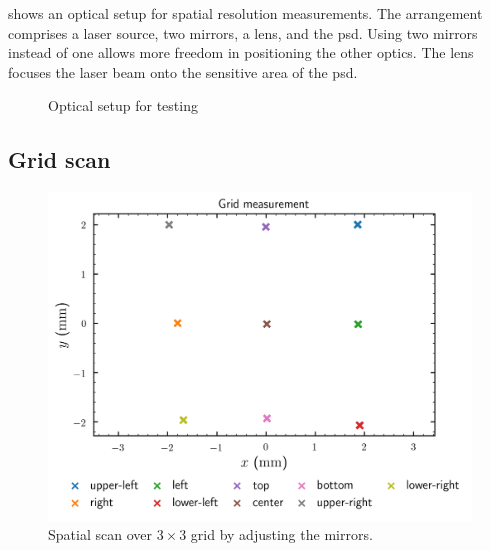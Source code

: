  shows an optical setup for spatial resolution measurements.
The arrangement comprises a laser source, two mirrors, a lens, and the \gls{psd}.
Using two mirrors instead of one allows more freedom in positioning the other optics.
The lens focuses the laser beam onto the sensitive area of the \gls{psd}.

\begin{figure}[htb]
	\centering
	
	\caption{Optical setup for testing}\label{fig:optical_setup}
\end{figure}

\subsection{Grid scan}

\begin{figure}[htb]
	\centering
	\includegraphics{figure/plot/grid-measurement}
	\caption{Spatial scan over $3\times 3$ grid by adjusting the mirrors.}\label{fig:grid_scan}
\end{figure}

